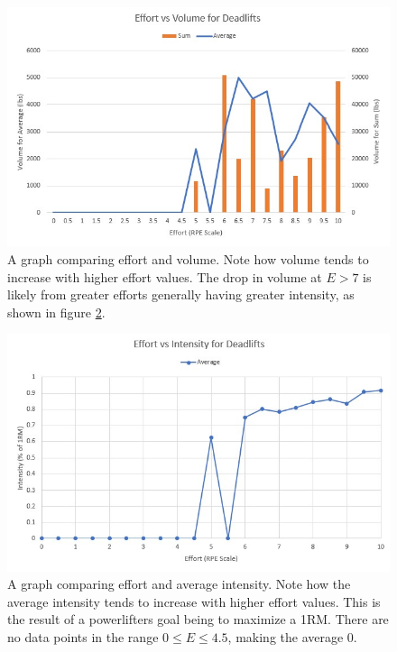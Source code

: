 \begin{figure}
    \centering
    \includegraphics[scale=1.6]{graphs/EffortVsVolumeGraph.jpg}
    \caption{A graph comparing effort and volume. Note how volume tends to increase with higher effort values. The drop in volume at $E>7$ is likely from greater efforts generally having greater intensity, as shown in figure \ref{fig:EffortVsIntensity}.}
    \label{fig:EffortVsVolumeGraph}
\end{figure}
\begin{figure}
    \centering
    \includegraphics[scale=1.6]{graphs/EffortVsIntensityGraph.jpg}
    \caption{A graph comparing effort and average intensity. Note how the average intensity tends to increase with higher effort values. This is the result of a powerlifters goal being to maximize a 1RM. There are no data points in the range $0\le E\le 4.5$, making the average $0$.}
    \label{fig:EffortVsIntensity}
\end{figure}

